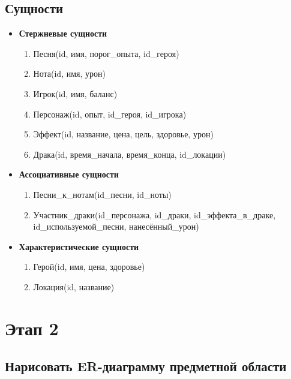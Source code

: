 \subsection*{Сущности}


\begin{itemize}
\item \textbf{Стержневые сущности}
\begin{enumerate}
    \item Песня(id, имя, порог\_опыта, id\_героя)
    \item Нота(id, имя, урон)
    \item Игрок(id, имя, баланс)
    \item Персонаж(id, опыт, id\_героя, id\_игрока)
    \item Эффект(id, название, цена, цель, здоровье, урон)
    \item Драка(id, время\_начала, время\_конца, id\_локации)
\end{enumerate}

\item \textbf{Ассоциативные сущности}
\begin{enumerate}
    \item Песни\_к\_нотам(id\_песни, id\_ноты)
    \item Участник\_драки(id\_персонажа, id\_драки, id\_эффекта\_в\_драке, id\_используемой\_песни, нанесённый\_урон)
\end{enumerate}

\item \textbf{Характеристические сущности}
\begin{enumerate}
    \item Герой(id, имя, цена, здоровье)
    \item Локация(id, название)
\end{enumerate}
\end{itemize}

\section*{Этап 2}


\subsection*{Нарисовать ER-диаграмму предметной области}

